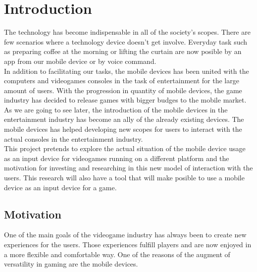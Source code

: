 




\chapter*{Introduction}


The technology has become indispensable in all of the society's scopes. There are few scenarios where a technology device doesn't get involve. Everyday task such as preparing coffee at the morning or lifting the curtain are now posible by an app from our mobile device or by voice command.\\

In addition to facilitating our tasks, the mobile devices has been united with the computers and videogames consoles in the task of entertainment for the large amount of users. With the progression in quantity of mobile devices, the game industry has decided to release games with bigger budges to the mobile market.\\

As we are going to see later, the introduction of the mobile devices in the entertainment industry has become an ally of the already existing devices. The mobile devices has helped developing new scopes for users to interact with the actual consoles in the entertainment industry.\\

This project pretends to explore the actual situation of the mobile device usage as an input device for videogames running on a different platform and the motivation for investing and researching in this new model of interaction with the users. This research will also have a tool that will make posible to use a mobile device as an input device for a game.\\

\section*{Motivation}


One of the main goals of the videogame industry has always been to create new experiences for the users. Those experiences fulfill players and are now enjoyed in a more flexible and comfortable way. One of the reasons of the augment of versatility in gaming are the mobile devices.\\

